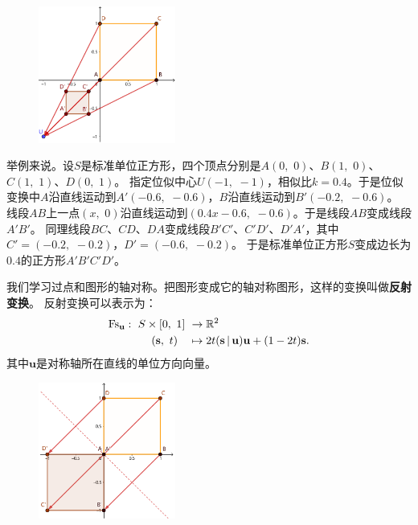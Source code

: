 \documentclass[12pt,UTF8]{ctexbook}
\begin{document}
\begin{figure} %
    \vspace{-12pt}
    \flushright
    \includegraphics[width=0.4\textwidth]{位似变换例1.png}
\end{figure}

举例来说。设$S$是标准单位正方形，四个顶点分别是$A(0,\,\,0)$、$B(1,\,\,0)$、$C(1,\,\,1)$、$D(0,\,\,1)$。
指定位似中心$U(-1,\,\,-1)$，相似比$k=0.4$。于是位似变换中$A$沿直线运动到$A'(-0.6,\,\,-0.6)$，$B$沿直线运动到$B'(-0.2,\,\,-0.6)$。
线段$AB$上一点$(x,\,\,0)$沿直线运动到$(0.4x - 0.6, \,\, -0.6)$。于是线段$AB$变成线段$A'B'$。
同理线段$BC$、$CD$、$DA$变成线段$B'C'$、$C'D'$、$D'A'$，其中$C'=(-0.2,\,\, -0.2)$，$D'=(-0.6,\,\,-0.2)$。
于是标准单位正方形$S$变成边长为$0.4$的正方形$A'B'C'D'$。

我们学习过点和图形的轴对称。把图形变成它的轴对称图形，这样的变换叫做\textbf{反射变换}。
反射变换可以表示为：
\begin{align}
    \mathrm{Fs}_\mathbf{u}: \,\, S\times[0,\,\,1] \,\,&\rightarrow \mathbb{R}^2 \notag \\
    (\mathbf{s},\,\, t) \quad &\mapsto 2t(\mathbf{s}\,|\,\mathbf{u})\mathbf{u} + (1 - 2t)\mathbf{s}. \notag
\end{align}
其中$\mathbf{u}$是对称轴所在直线的单位方向向量。

\begin{figure} %
    \vspace{-42pt}
    \flushright
    \includegraphics[width=0.4\textwidth]{反射变换例1.png}
\end{figure}
\end{document}
